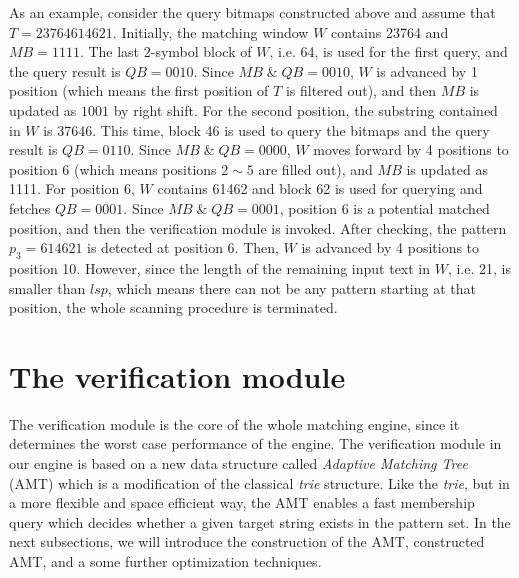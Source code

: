 \documentclass{article}
\begin{document}
As an example, consider the query bitmaps constructed above and assume
that $T=23764614621$. Initially, the matching window $W$ contains
23764 and $MB = 1111$. The last 2-symbol block of $W$, i.e. 64, is
used for the first query, and the query result is $QB=0010$. Since
$MB\; \&\; QB = 0010$, $W$ is advanced by 1 position (which means the
first position of $T$ is filtered out), and then $MB$ is updated as
$1001$ by right shift. For the second position, the substring
contained in $W$ is 37646.  This time, block 46 is used to query the
bitmaps and the query result is $QB=0110$. Since $MB\; \& \; QB=0000$,
$W$ moves forward by 4 positions to position 6 (which means positions
$2 \sim 5$ are filled out), and $MB$ is updated as 1111. For position
6, $W$ contains 61462 and block 62 is used for querying and fetches
$QB = 0001$. Since $MB\; \& \; QB = 0001$, position 6 is a potential
matched position, and then the verification module is invoked. After
checking, the pattern $p_3=614621$ is detected at position 6. Then,
$W$ is advanced by 4 positions to position 10. However, since the
length of the remaining input text in $W$, i.e. 21, is smaller than
$lsp$, which means there can not be any pattern starting at that
position, the whole scanning procedure is terminated.


\section{The verification module}
\label{sec:verification}

The verification module is the core of the whole matching engine,
since it determines the worst case performance of the engine. The
verification module in our engine is based on a new data structure
called \emph{Adaptive Matching Tree} (AMT) which is a modification of
the classical \emph{trie} structure. Like the \emph{trie}, but in a
more flexible and space efficient way, the AMT enables a fast
membership query which decides whether a given target string exists in
the pattern set. In the next subsections, we will introduce the
construction of the AMT, constructed AMT, and a some further
optimization techniques.
\end{document}
